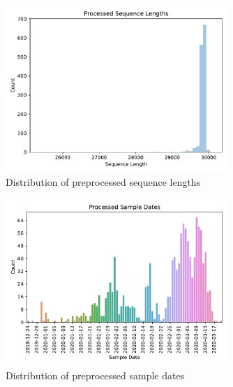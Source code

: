 \documentclass{article}
\begin{document}
\begin{figure}[h]
\centering
\includegraphics[width=0.75\textwidth,keepaspectratio]{./figs/processed_sequence_lengths.pdf}
\caption{Distribution of preprocessed sequence lengths}
\end{figure}



\begin{figure}[h]
\centering
\includegraphics[width=0.75\textwidth,keepaspectratio]{./figs/processed_sample_dates.pdf}
\caption{Distribution of preprocessed sample dates}
\end{figure}
\end{document}
